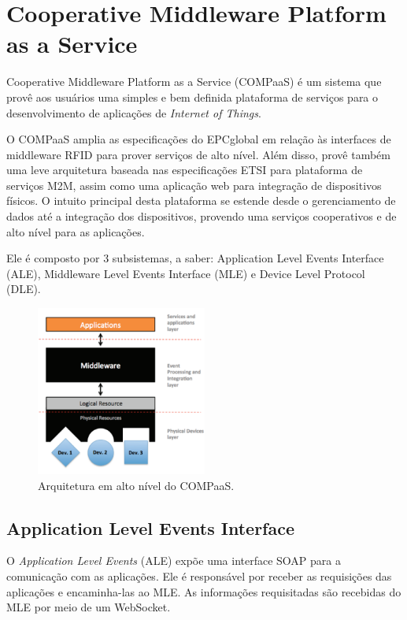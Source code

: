 \section{Cooperative Middleware Platform as a Service}
\label{sec:COMPaaS}
Cooperative Middleware Platform as a Service (COMPaaS) é um sistema que provê aos usuários uma simples e bem
definida plataforma de serviços para o desenvolvimento de aplicações de \textit{Internet of Things}.

O COMPaaS amplia as especificações do EPCglobal em relação às interfaces de middleware RFID para
prover serviços de alto nível. Além disso, provê também uma leve arquitetura baseada nas especificações
ETSI para plataforma de serviços M2M, assim como uma aplicação web para integração de dispositivos físicos.
O intuito principal desta plataforma se estende desde o gerenciamento de dados até a integração dos
dispositivos, provendo uma serviços cooperativos e de alto nível para as aplicações.

Ele é composto por 3 subsistemas, a saber:  Application Level Events
Interface (ALE), Middleware Level Events Interface (MLE) e Device Level Protocol (DLE).

\begin{figure}[H]
	\centering
		\includegraphics[width=0.5\textwidth]{fig/compaas_arch.png}
	\caption{Arquitetura em alto nível do COMPaaS.}
\end{figure}

\subsection{Application Level Events Interface}
O \textit{Application Level Events} (ALE) expõe uma interface SOAP para a comunicação com as aplicações.
Ele é responsável por receber as requisições das aplicações e encaminha-las ao MLE. As informações
requisitadas são recebidas do MLE por meio de um WebSocket.

